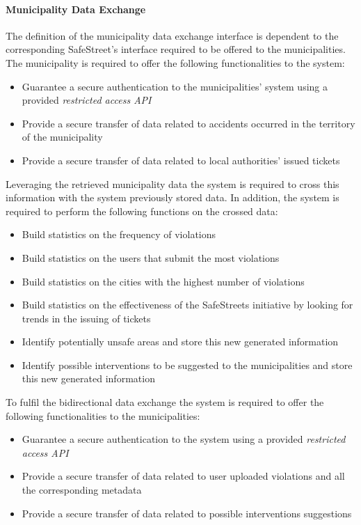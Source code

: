 	\clearpage
\paragraph{Municipality Data Exchange} \label{p:mde} The definition of the municipality data exchange interface is dependent to the corresponding SafeStreet's interface required to be offered to the municipalities. The municipality is required to offer the following functionalities to the system:

	\begin{itemize}
		\item Guarantee a secure authentication to the municipalities' system using a provided \emph{restricted access API}
		\item Provide a secure transfer of data related to accidents occurred in the territory of the municipality
		\item Provide a secure transfer of data related to local authorities' issued tickets 
	\end{itemize} 
Leveraging the retrieved municipality data the system is required to cross this information with the system previously stored data. In addition, the system is required to perform the following functions on the crossed data:
	
	\begin{itemize}
		\item Build statistics on the frequency of violations
		\item Build statistics on the users that submit the most violations
		\item Build statistics on the cities with the highest number of violations
		\item Build statistics on the effectiveness of the SafeStreets initiative by looking for trends in the issuing of tickets
		\item Identify potentially unsafe areas and store this new generated information 
		\item Identify possible interventions to be suggested to the municipalities and store this new generated information 
	\end{itemize}
To fulfil the bidirectional data exchange the system is required to offer the following functionalities to the municipalities:
	
	\begin{itemize}
		\item Guarantee a secure authentication to the system using a provided \emph{restricted access API}
		\item Provide a secure transfer of data related to user uploaded violations and all the corresponding metadata
		\item Provide a secure transfer of data related to possible interventions suggestions 
		
	\end{itemize} 
	
